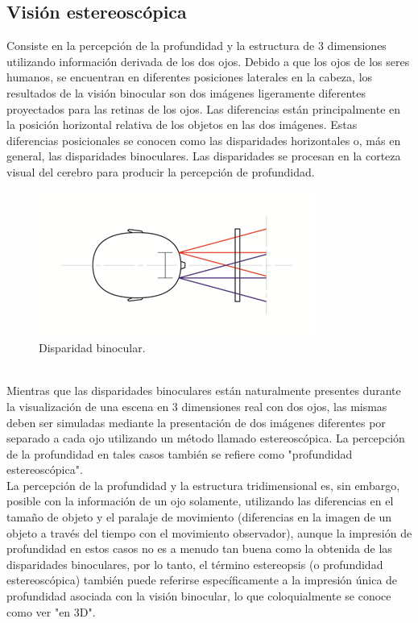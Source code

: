\documentclass[12pt]{article}
\begin{document}
\subsection{Visión estereoscópica}
Consiste en la percepción de la profundidad y la estructura de 3 dimensiones utilizando información derivada de los dos ojos. Debido a que los ojos de los seres humanos, se encuentran en diferentes posiciones laterales en la cabeza, los resultados de la visión binocular son dos imágenes ligeramente diferentes proyectados para las retinas de los ojos. Las diferencias están principalmente en la posición horizontal relativa de los objetos en las dos imágenes. Estas diferencias posicionales se conocen como las disparidades horizontales o, más en general, las disparidades binoculares. Las disparidades se procesan en la corteza visual del cerebro para producir la percepción de profundidad\cite{visionest}. 
\begin{figure}[h!]
\includegraphics[width =0.7\linewidth, center]{ojos.png}
\caption{Disparidad binocular.}
\label{ fig : surface }
\end{figure}
\\Mientras que las disparidades binoculares están naturalmente presentes durante la visualización de una escena en 3 dimensiones real con dos ojos, las mismas deben ser simuladas mediante la presentación de dos imágenes diferentes por separado a cada ojo utilizando un método llamado estereoscópica. La percepción de la profundidad en tales casos también se refiere como "profundidad estereoscópica". 
\\La percepción de la profundidad y la estructura tridimensional  es, sin embargo, posible con la información de un ojo solamente, utilizando las diferencias en el tamaño de objeto y el paralaje de movimiento (diferencias en la imagen de un objeto a través del tiempo con el movimiento observador), aunque la impresión de profundidad en estos casos no es a menudo tan buena como la obtenida de las disparidades binoculares, por lo tanto, el término estereopsis (o profundidad estereoscópica) también puede referirse específicamente a la impresión única de profundidad asociada con la visión binocular, lo que coloquialmente se conoce como ver "en 3D".
\end{document}
